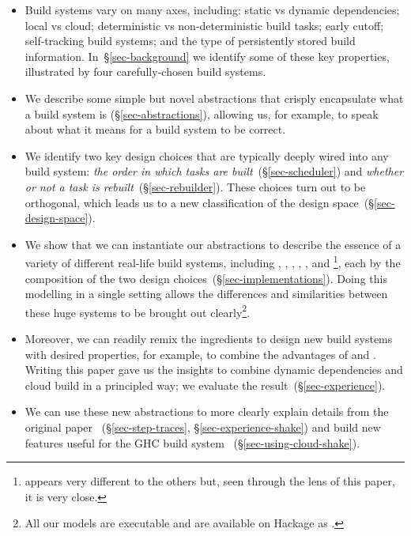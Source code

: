 \begin{itemize}
\item Build systems vary on many axes, including: static vs dynamic
  dependencies; local vs cloud; deterministic vs non-deterministic build tasks;
  early cutoff; self-tracking build systems; and the type of persistently stored
  build information. In~\S\ref{sec-background} we identify some of these key
  properties, illustrated by four carefully-chosen build systems.

\item We describe some simple but novel abstractions that
  crisply encapsulate what a build system is (\S\ref{sec-abstractions}),
  allowing us, for example, to speak about what it means for a build system to
  be correct.

\item We identify two key design choices that are typically deeply wired into
  any build system: \emph{the order in which tasks are
  built}~(\S\ref{sec-scheduler}) and \emph{whether or not a
  task is rebuilt}~(\S\ref{sec-rebuilder}). These choices turn out to
  be orthogonal, which leads us to a new classification of the design
  space~(\S\ref{sec-design-space}).

\item We show that we can instantiate our abstractions to describe the essence
of a variety of different real-life build systems, including \Make, \Shake,
\Bazel, \Buck, \Nix, and \Excel\footnote{\Excel appears very different to the
others but, seen through the lens of this paper, it is very close.}, each by the
composition of the two design choices~(\S\ref{sec-implementations}). Doing this
modelling in a single setting allows the differences and similarities between
these huge systems to be brought out clearly\footnote{All our models are
executable and are available on Hackage as .}.

\item Moreover, we can readily remix the ingredients to design new build systems
with desired properties, for example, to combine the advantages of \Shake and
\Bazel. Writing this paper gave us the insights to combine dynamic dependencies and
cloud build in a principled way; we evaluate the result~(\S\ref{sec-experience}).

\item We can use these new abstractions to more clearly explain details from the
original \Shake paper~\cite{mitchell2012shake} (\S\ref{sec-step-traces},
\S\ref{sec-experience-shake}) and build new features useful for the GHC build
system~\cite{hadrian} (\S\ref{sec-using-cloud-shake}).

\end{itemize}

